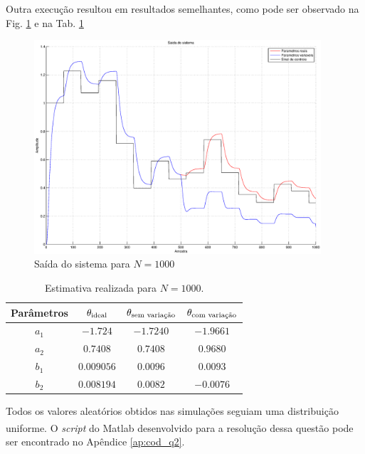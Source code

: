 Outra execução resultou em resultados semelhantes, como pode ser observado na
Fig. \ref{fig:saida_sist_1000_2} e na Tab. \ref{tab:estimativa_1000_2}

\begin{figure}[htb]
\centering
    \includegraphics[width=0.95\textwidth]{imgs/questao2/saida_1000_2}
    \caption{Saída do sistema para $N = 1000$}
    \label{fig:saida_sist_1000_2}
\end{figure}

\begin{table}
\centering
    \caption{Estimativa realizada para $N = 1000$.}
    \label{tab:estimativa_1000_2}
    \vspace{0.25cm}
    \begin{tabular}{|c|c|c|c|}
        \hline
        Parâmetros & 
        $\mathbf{\theta}_{\text{ideal}}$&
        $\mathbf{\theta}_{\text{sem variação}}$&
        $\mathbf{\theta}_{\text{com variação}}$\\
        \hline
        \hline
        $a_1$ & $-1.724$   & $-1.7240$ & $-1.9661$ \\
        \hline
        $a_2$ & $0.7408$   & $0.7408$  & $0.9680$ \\
        \hline
        $b_1$ & $0.009056$ & $0.0096$  & $0.0093$ \\
        \hline
        $b_2$ & $0.008194$ & $0.0082$  & $-0.0076$ \\
        \hline
    \end{tabular}
\end{table}

Todos os valores aleatórios obtidos nas simulações seguiam uma distribuição
uniforme. O {\it script} do Matlab\textsuperscript{\textregistered} desenvolvido
para a resolução dessa questão pode ser encontrado no Apêndice \ref{ap:cod_q2}.
